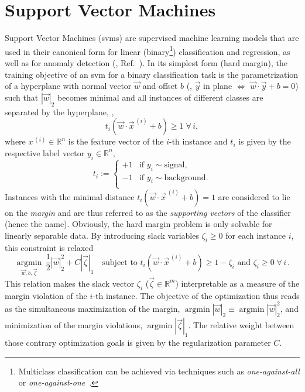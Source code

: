 \chapter{Support Vector Machines}
\label{chap:svm}
Support Vector Machines (\glspl{svm}) are supervised machine learning models that are used in their canonical form for linear (binary\footnote{Multiclass classification can be achieved via techniques such as \textit{one-against-all} or \textit{one-against-one}~\cite{svmmulticlass}.}) classification and regression, as well as for anomaly detection (\eg{}, Ref.~\cite{svm}).
In its simplest form (hard margin), the training objective of an \gls{svm} for a binary classification task is the parametrization of a hyperplane with normal vector $\vec{w}$ and offset $b$ (\ie{}, $\vec{y}$ in plane $\Leftrightarrow$ $\vec{w} \cdot \vec{y} + b = 0$) such that $|\vec w|_2$ becomes minimal and all instances of different classes are separated by the hyperplane, \ie{},
$$t_i \left( \vec{w} \cdot \vec{x}^{\,(i)} + b \right) \ge 1 \; \forall \, i,$$
where $x^{\,(i)} \in \mathbb{R}^n$ is the feature vector of the $i$-th instance and $t_i$ is given by the respective label vector $y_i \in \mathbb{R}^n$,
\begin{equation*}
t_i := \begin{cases}
    +1 & \text{if } y_i \sim \text{signal}, \\
    -1 & \text{if } y_i \sim \text{background}. \\
\end{cases}
\end{equation*}
Instances with the minimal distance $t_i \left( \vec{w} \cdot \vec{x}^{\,(i)} + b \right) = 1$ are considered to lie on the \textit{margin} and are thus referred to as the \textit{supporting vectors} of the classifier (hence the name).
Obviously, the hard margin problem is only solvable for linearly separable data.
By introducing slack variables $\zeta_i \ge 0$ for each instance $i$, this constraint is relaxed
\begin{equation}
    \label{eq:apdx_svm}
    \underset{\vec w, b, \vec \zeta}{\operatorname{argmin}} \, \frac{1}{2} |\vec{w}|_2^2 + C |\vec \zeta|_1
    \quad \text{subject to }
    t_i \left( \vec w \cdot \vec{x}^{\,(i)} + b \right) \ge 1 - \zeta_i
    \text{ and }
    \zeta_i \ge 0 \; \forall \, i \,.
\end{equation}
This relation makes the slack vector $\zeta_i$ ($\vec{\zeta} \in \mathbb{R}^m$) interpretable as a measure of the margin violation of the $i$-th instance.
The objective of the optimization thus reads as the simultaneous maximization of the margin, $\operatorname{argmin} |\vec w |_2 \equiv \operatorname{argmin} |\vec w |_2^2$, and minimization of the margin violations, $\operatorname{argmin} |\vec \zeta |_1 $.
The relative weight between those contrary optimization goals is given by the regularization parameter $C$.

